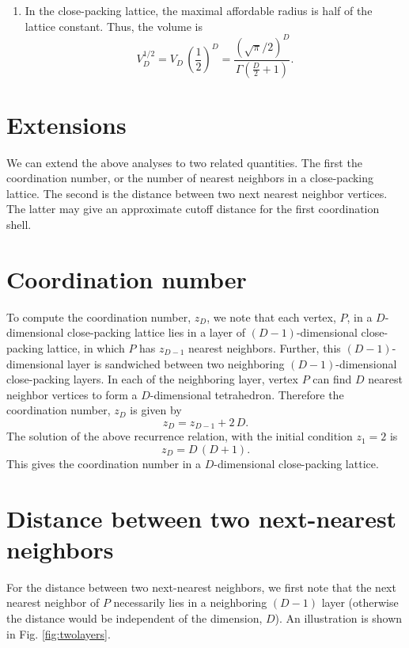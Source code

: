 \documentclass{article}
\begin{document}
\begin{enumerate}
\item
In the close-packing lattice,
the maximal affordable radius is
half of the lattice constant.
Thus, the volume is
$$
V_D^{1/2}
=
V_D \,
\left( \frac 1 2 \right)^D
=
\frac{   \left( \sqrt \pi / 2 \right)^D   }
     { \Gamma\left( \frac D 2 + 1 \right) }
.
$$

\end{enumerate}






\section{Extensions}


We can extend the above analyses to two related quantities.
%
The first the coordination number,
or the number of nearest neighbors in a close-packing lattice.
%
The second is the distance between two next nearest neighbor vertices.
%
The latter may give an approximate cutoff distance
for the first coordination shell.


\section{Coordination number}


To compute the coordination number, $z_D$,
we note that each vertex, $P$,
in a $D$-dimensional close-packing lattice
lies in a layer of $(D-1)$-dimensional
close-packing lattice,
in which $P$ has $z_{D - 1}$ nearest neighbors.
%
Further, this $(D-1)$-dimensional layer
is sandwiched between two neighboring
$(D-1)$-dimensional close-packing layers.
%
In each of the neighboring layer,
vertex $P$ can find $D$ nearest neighbor vertices
to form a $D$-dimensional tetrahedron.
%
Therefore the coordination number, $z_D$
is given by
$$
z_D = z_{D - 1} + 2 \, D.
$$
%
The solution of the above recurrence relation,
with the initial condition $z_1 = 2$ is
$$
z_D = D \, (D + 1).
$$
%
This gives the coordination number
in a $D$-dimensional close-packing lattice.


\section{Distance between two next-nearest neighbors}


For the distance between two next-nearest neighbors,
we first note that the next nearest neighbor of $P$
necessarily lies in a neighboring $(D-1)$ layer
(otherwise the distance would be independent of the dimension, $D$).
%
An illustration is shown in Fig. \ref{fig:twolayers}.
\end{document}
